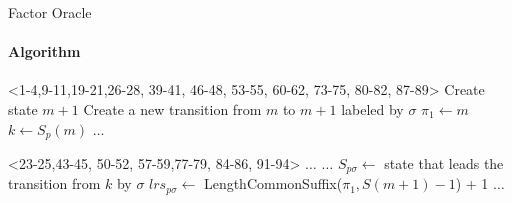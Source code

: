 \begin{frame}[fragile]{Factor Oracle}
  \framesubtitle{Algorithm}
  \vspace{-0.5cm}
  \begin{minipage}[t][4.5cm][t]{\textwidth}
    \begin{algorithm}[H]
      \caption{Incremental update of Factor Oracle}\label{alg:addletter}
      \begin{algorithmic}[1]

        \only<1-4,9-11,19-21,26-28, 39-41, 46-48, 53-55, 60-62, 73-75,
        80-82, 87-89>{%
          \State Create state $m+1$
          \State Create a new transition from $m$ to $m+1$ labeled by
          $\sigma$ 
          \State $\pi_{1} \gets m$
          \State $k \gets S_{p}(m)$
          \State $\dots$
        }



        \only<23-25,43-45, 50-52, 57-59,77-79,
        84-86, 91-94>{
          \State $\dots$
          \State $\dots$
          \Else
          \State $S_{p\sigma}\gets $ state that leads the transition
          from $k$ by $\sigma$
          \State $lrs_{p\sigma} \gets $ LengthCommonSuffix($\pi_{1},S(m+1)-1$) + 1
          \EndIf
          \State $\dots$
        }



\end{algorithmic}
\end{algorithm}
\end{minipage}
\end{frame}
